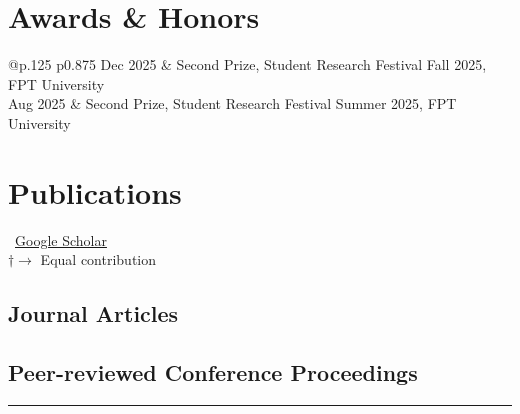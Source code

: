 \vspace{-0.6em}
\section*{Awards \& Honors}
\label{awards}
\vspace{-0.4em}
\begin{longtable}[l]{@{}p{.125\textwidth} p{0.875\textwidth}}
  Dec 2025 & Second Prize, Student Research Festival Fall 2025, FPT University \\
  Aug 2025 & Second Prize, Student Research Festival Summer 2025, FPT University \\
\end{longtable}

\vspace{-0.3em}
\section*{Publications}
\label{pubs}

\vspace{-.75em}
\small
\faGoogle~\href{https://scholar.google.com/citations?user=Yj6Wo9EAAAAJ}{Google Scholar}\\
$\dagger \rightarrow$ Equal contribution
\normalsize

\subsection*{Journal Articles}
\label{journal-article}
\newrefcontext[labelprefix=J]
\nocite{*}
\printbibliography[
  type=article,
  heading=none,
  resetnumbers=true,
  keyword=J
]

\subsection*{Peer-reviewed Conference Proceedings}
\label{conferences}
\newrefcontext[labelprefix=C]
\printbibliography[type=inproceedings,heading=none,resetnumbers=true,keyword=C]

\centering
\rule{0.25\linewidth}{0.4pt}\\


